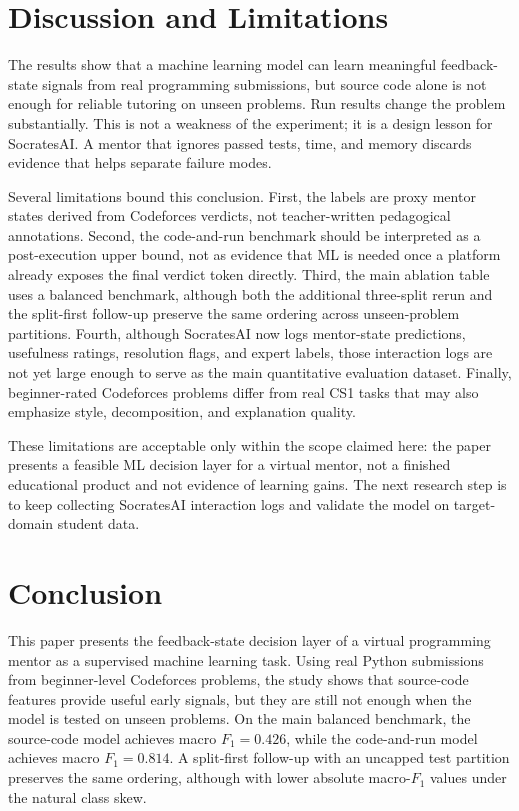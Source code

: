 \documentclass[conference]{IEEEtran}
\begin{document}
\section{Discussion and Limitations}

The results show that a machine learning model can learn meaningful feedback-state signals from real programming submissions, but source code alone is not enough for reliable tutoring on unseen problems. Run results change the problem substantially. This is not a weakness of the experiment; it is a design lesson for SocratesAI. A mentor that ignores passed tests, time, and memory discards evidence that helps separate failure modes.

Several limitations bound this conclusion. First, the labels are proxy mentor states derived from Codeforces verdicts, not teacher-written pedagogical annotations. Second, the code-and-run benchmark should be interpreted as a post-execution upper bound, not as evidence that ML is needed once a platform already exposes the final verdict token directly. Third, the main ablation table uses a balanced benchmark, although both the additional three-split rerun and the split-first follow-up preserve the same ordering across unseen-problem partitions. Fourth, although SocratesAI now logs mentor-state predictions, usefulness ratings, resolution flags, and expert labels, those interaction logs are not yet large enough to serve as the main quantitative evaluation dataset. Finally, beginner-rated Codeforces problems differ from real CS1 tasks that may also emphasize style, decomposition, and explanation quality.

These limitations are acceptable only within the scope claimed here: the paper presents a feasible ML decision layer for a virtual mentor, not a finished educational product and not evidence of learning gains. The next research step is to keep collecting SocratesAI interaction logs and validate the model on target-domain student data.

\section{Conclusion}

This paper presents the feedback-state decision layer of a virtual programming mentor as a supervised machine learning task. Using real Python submissions from beginner-level Codeforces problems, the study shows that source-code features provide useful early signals, but they are still not enough when the model is tested on unseen problems. On the main balanced benchmark, the source-code model achieves macro $F_1=0.426$, while the code-and-run model achieves macro $F_1=0.814$. A split-first follow-up with an uncapped test partition preserves the same ordering, although with lower absolute macro-$F_1$ values under the natural class skew.
\end{document}
